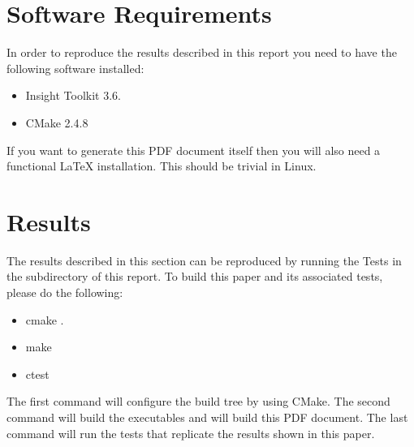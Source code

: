 \documentclass{InsightArticle}
\begin{document}
\section{Software Requirements}

In order to reproduce the results described in this report you need to have the
following software installed:

\begin{itemize}
  \item  Insight Toolkit 3.6.
  \item  CMake 2.4.8
\end{itemize}

If you want to generate this PDF document itself then you will also need a
functional LaTeX installation. This should be trivial in Linux.

\appendix

\section{Results}

The results described in this section can be reproduced by running the Tests in
the  subdirectory of this report. To build this paper and its
associated tests, please do the following:

\begin{itemize}
\item cmake .
\item make
\item ctest
\end{itemize}

The first command will configure the build tree by using CMake. The second
command will build the executables and will build this PDF document. The last
command will run the tests that replicate the results shown in this paper.
\end{document}
